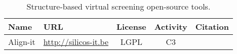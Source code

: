 \begin{table} 
    \begin{tabular}{ l l c c c  }
    Name & URL & License & Activity & Citation \\ \hline
Align-it & \url{http://silicos-it.be} & LGPL & C3 & \\

    \end{tabular} 
    \caption{\label{qsartable} Structure-based virtual screening open-source tools.}
\end{table}